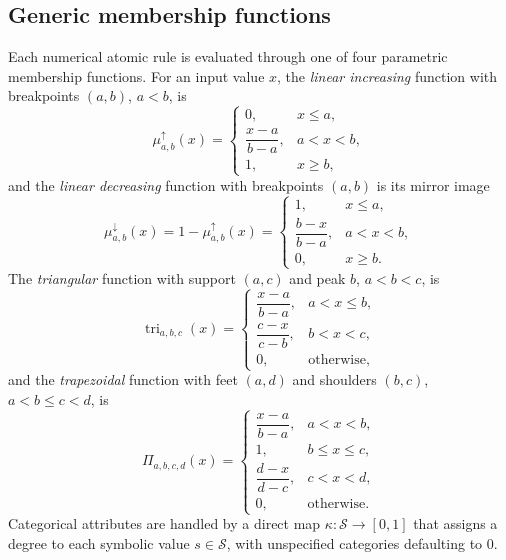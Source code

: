 \documentclass{interact}
\begin{document}
\subsection{Generic membership functions}\label{app:context_math_mf}

Each numerical atomic rule is evaluated through one of four parametric membership functions. For an input value $x$, the \emph{linear increasing} function with breakpoints $(a,b)$, $a<b$, is
\begin{equation}
\mu^{\uparrow}_{a,b}(x)=
\begin{cases}
0, & x \le a,\\[2pt]
\dfrac{x-a}{b-a}, & a < x < b,\\[6pt]
1, & x \ge b,
\end{cases}
\label{eq:mf_linc}
\end{equation}
and the \emph{linear decreasing} function with breakpoints $(a,b)$ is its mirror image
\begin{equation}
\mu^{\downarrow}_{a,b}(x)=1-\mu^{\uparrow}_{a,b}(x)=
\begin{cases}
1, & x \le a,\\[2pt]
\dfrac{b-x}{b-a}, & a < x < b,\\[6pt]
0, & x \ge b.
\end{cases}
\label{eq:mf_ldec}
\end{equation}
The \emph{triangular} function with support $(a,c)$ and peak $b$, $a<b<c$, is
\begin{equation}
\operatorname{tri}_{a,b,c}(x)=
\begin{cases}
\dfrac{x-a}{b-a}, & a < x \le b,\\[6pt]
\dfrac{c-x}{c-b}, & b < x < c,\\[6pt]
0, & \text{otherwise},
\end{cases}
\label{eq:mf_tri}
\end{equation}
and the \emph{trapezoidal} function with feet $(a,d)$ and shoulders $(b,c)$, $a<b\le c<d$, is
\begin{equation}
\Pi_{a,b,c,d}(x)=
\begin{cases}
\dfrac{x-a}{b-a}, & a < x < b,\\[6pt]
1, & b \le x \le c,\\[2pt]
\dfrac{d-x}{d-c}, & c < x < d,\\[6pt]
0, & \text{otherwise}.
\end{cases}
\label{eq:mf_trap}
\end{equation}
Categorical attributes are handled by a direct map $\kappa:\mathcal{S}\to[0,1]$ that assigns a degree to each symbolic value $s\in\mathcal{S}$, with unspecified categories defaulting to $0$.
\end{document}
